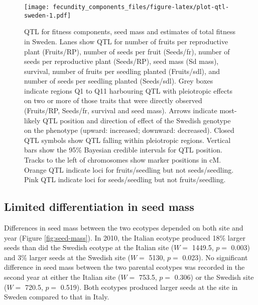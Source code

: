 \documentclass[]{article}
\begin{document}
\begin{figure}
\centering
\texttt{[image: fecundity\_components\_files/figure-latex/plot-qtl-sweden-1.pdf]}
\caption{\label{fig:plot-qtl-sweden}QTL for fitness components, seed mass and estimates of total fitness in Sweden. Lanes show QTL for number of fruits per reproductive plant (Fruits/RP), number of seeds per fruit (Seeds/fr), number of seeds per reproductive plant (Seeds/RP), seed mass (Sd mass), survival, number of fruits per seedling planted (Fruits/sdl), and number of seeds per seedling planted (Seeds/sdl). Grey boxes indicate regions Q1 to Q11 harbouring QTL with pleiotropic effects on two or more of those traits that were directly observed (Fruits/RP, Seeds/fr, survival and seed mass). Arrows indicate most-likely QTL position and direction of effect of the Swedish genotype on the phenotype (upward: increased; downward: decreased). Closed QTL symbols show QTL falling within pleiotropic regions. Vertical bars show the 95\% Bayesian credible intervals for QTL position. Tracks to the left of chromosomes show marker positions in cM. Orange QTL indicate loci for fruits/seedling but not seeds/seedling. Pink QTL indicate loci for seeds/seedling but not fruits/seedling.}
\end{figure}

\hypertarget{limited-differentiation-in-seed-mass}{%
\subsection{Limited differentiation in seed mass}\label{limited-differentiation-in-seed-mass}}

Differences in seed mass between the two ecotypes depended on both site and year (Figure \ref{fig:seed-mass}). In 2010, the Italian ecotype produced 18\% larger seeds than did the Swedish ecotype at the Italian site
(\(W=\) 1449.5,
\(p=\) 0.003)
and 3\% larger seeds at the Swedish site
(\(W =\) 5130,
\(p=\) 0.023).
No significant difference in seed mass between the two parental ecotypes was recorded in the second year at either the Italian site
(\(W =\) 753.5,
\(p=\) 0.306)
or the Swedish site
(\(W=\) 720.5,
\(p=\) 0.519).
Both ecotypes produced larger seeds at the site in Sweden compared to that in Italy.
\end{document}
